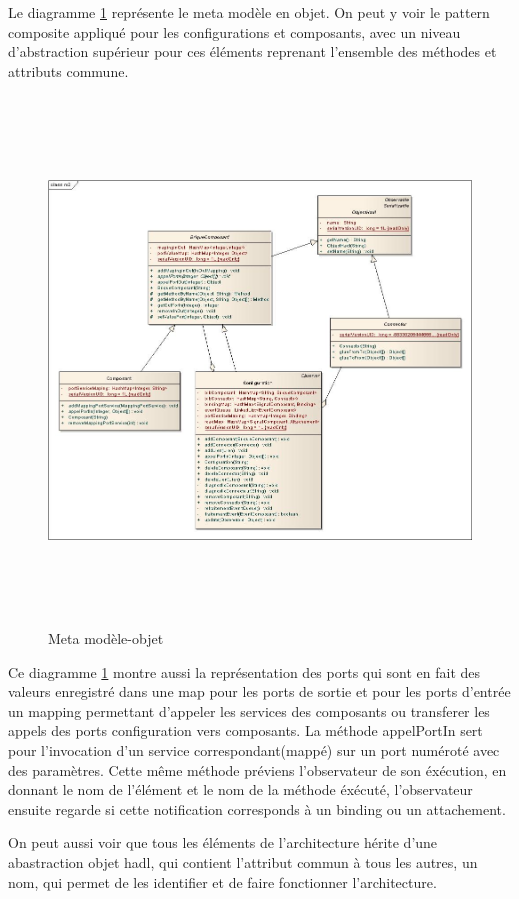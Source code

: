 \documentclass[11pt,a4paper]{article}
\begin{document}
Le diagramme \ref{Meta modèle-objet} représente le meta modèle en objet. On peut y voir le pattern composite appliqué pour les configurations et composants, avec un niveau d'abstraction supérieur pour ces éléments reprenant l'ensemble des méthodes et attributs commune.

\begin{figure}[h]
  		\centering
  		\includegraphics[height=14cm,width=15cm]{m2impl.jpg}
  		\caption{Meta modèle-objet}
  		\label{Meta modèle-objet}
\end{figure}


Ce diagramme \ref{Meta modèle-objet} montre aussi la représentation des ports qui sont en fait des valeurs enregistré dans une map pour les ports de sortie et pour les ports d'entrée un mapping permettant d'appeler les services des composants ou transferer les appels des ports configuration vers composants. La méthode appelPortIn sert pour l'invocation d'un service correspondant(mappé) sur un port numéroté avec des paramètres. Cette même méthode préviens l'observateur de son éxécution, en donnant le nom de l'élément et le nom de la méthode éxécuté, l'observateur ensuite regarde si cette notification corresponds à un binding ou un attachement. 

On peut aussi voir que tous les éléments de l'architecture hérite d'une abastraction objet hadl, qui contient l'attribut commun à tous les autres, un nom, qui permet de les identifier et de faire fonctionner l'architecture. 
\end{document}
